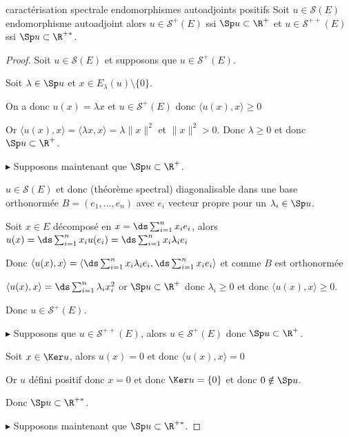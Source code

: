 \begin{theorement}{caractérisation spectrale endomorphismes autoadjoints positifs}{}
    Soit $u \in \mathscr S(E)$ endomorphisme autoadjoint 
    alors $u \in \mathscr S^+(E)$ ssi $\Sp u \subset \R^+$ et 
    $u \in \mathscr S^{++}(E)$ ssi $\Sp u \subset \R^{+*}$.
\end{theorement}

\begin{proof}
    Soit $u \in \mathscr S(E)$ et supposons que $u \in \mathscr S^+(E)$.

    Soit $\lambda \in \Sp u$ et $x \in E_\lambda(u) \setminus \{0\}$.

    On a donc $u(x) = \lambda x$ et $u \in \mathscr S^+(E)$ donc $\langle u(x), x \rangle \geqslant 0$

    Or $\langle u(x), x \rangle = \langle \lambda x, x \rangle = \lambda \| x \|^2$ et $\| x \|^2 > 0$.
    Donc $\lambda \geqslant 0$ et donc $\Sp u \subset \R^+$.

    \lvspace $\blacktriangleright$ Supposons maintenant que $\Sp u \subset \R^+$.

    $u \in \mathscr S(E)$ et donc (théorème spectral) diagonalisable dans une base orthonormée 
    $B = (e_1, \dots, e_n)$ avec $e_i$ vecteur propre pour un $\lambda_i \in \Sp u$. 

    Soit $x \in E$ décomposé en $x = \ds \sum_{i = 1}^{n } x_i e_i$, alors 
    $u(x) = \ds \sum_{i = 1}^{n} x_i u(e_i) = \ds \sum_{i = 1}^{n} x_i \lambda_i e_i$ 

    Donc $\langle u(x), x \rangle = \left\langle \ds \sum_{i = 1}^{n} x_i \lambda_i e_i, \ds \sum_{i = 1}^{n} x_i e_i \right\rangle$ 
    et comme $B$ est orthonormée

    $\langle u(x), x \rangle = \ds \sum_{i=1}^{n} \lambda_i x_i^2$ 
    or $\Sp u \subset \R^+$ donc $\lambda_i \geqslant 0$ et donc $\langle u(x), x \rangle \geqslant 0$.

    Donc $u \in \mathscr S^+(E)$.

    \lvspace $\blacktriangleright$ Supposons que $u \in \mathscr S^{++}(E)$, alors 
    $u \in \mathscr S^+(E)$ donc $\Sp u \subset \R^+$. 

    Soit $x \in \Ker u$, alors $u(x) = 0$ et donc $\langle u(x), x \rangle = 0$ 

    Or $u$ défini positif donc $x = 0$ et donc $\Ker u = \{0\}$ et donc $0 \notin \Sp u$.

    Donc $\Sp u \subset \R^{+*}$.

    \lvspace $\blacktriangleright$ Supposons maintenant que $\Sp u \subset \R^{+*}$. 


\end{proof}
